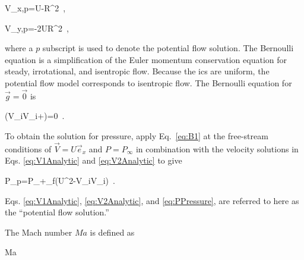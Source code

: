 \beq
\label{eq:V1Analytic}
V_{x,p}=U\left{}-R^2\right\rbrack\ ,
\eeq

\beq
\label{eq:V2Analytic}
V_{y,p}=-2UR^2\ ,
\eeq

\noindent where a \(p\) subscript is used to denote the potential flow solution. The Bernoulli equation is a simplification of the Euler momentum conservation equation for steady, irrotational, and isentropic flow. Because the \glspl{ic} are uniform, the potential flow model corresponds to isentropic flow. The Bernoulli equation for \(\vec{g}=\vec{0}\) is

\beq
\label{eq:B1}
\nabla\left(V_iV_i+\right)=0\ .
\eeq

\noindent To obtain the solution for pressure, apply Eq.\ \eqref{eq:B1} at the free-stream conditions of \(\vec{V}=U\vec{e}_x\) and \(P=P_\infty\) in combination with the velocity solutions in Eqs. \eqref{eq:V1Analytic} and \eqref{eq:V2Analytic} to give

\beq
\label{eq:PPressure}
P_p=P_\infty+\rho_f\left(U^2-V_iV_i\right)\ .
\eeq

\noindent Eqs. \eqref{eq:V1Analytic}, \eqref{eq:V2Analytic}, and \eqref{eq:PPressure}, are referred to here as the ``potential flow solution.''

The Mach number \(Ma\) is defined as

\beq
\label{eq:MaDef}
Ma\equiv{}\ 
\eeq

